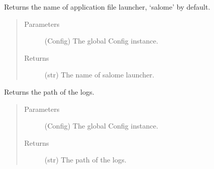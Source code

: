 \documentclass[a4paper,10pt,english]{sphinxmanual}
\begin{document}

\begin{fulllineitems}
\label{\detokenize{apidoc_src/src:src.utilsSat.get_launcher_name}}
Returns the name of application file launcher, ‘salome’ by default.
\begin{quote}\begin{description}
\item[{Parameters}] \leavevmode
{} \textendash{} (Config) The global Config instance.

\item[{Returns}] \leavevmode
(str) The name of salome launcher.

\end{description}\end{quote}

\end{fulllineitems}


\begin{fulllineitems}
\label{\detokenize{apidoc_src/src:src.utilsSat.get_log_path}}
Returns the path of the logs.
\begin{quote}\begin{description}
\item[{Parameters}] \leavevmode
{} \textendash{} (Config) The global Config instance.

\item[{Returns}] \leavevmode
(str) The path of the logs.

\end{description}\end{quote}

\end{fulllineitems}


\begin{fulllineitems}
\label{\detokenize{apidoc_src/src:src.utilsSat.get_property_in_product_cfg}}
\end{fulllineitems}
\end{document}
